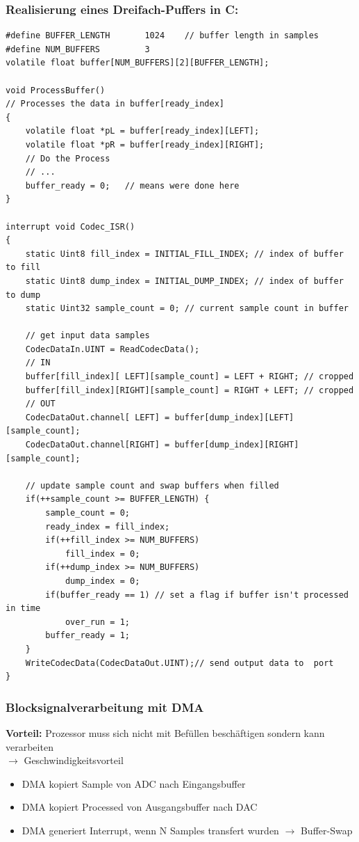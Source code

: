 \documentclass[10pt,a4paper]{article}
\begin{document}
\subsubsection{Realisierung eines Dreifach-Puffers in C:}
\begin{verbatim}
#define BUFFER_LENGTH   	1024	// buffer length in samples 
#define NUM_BUFFERS         3
volatile float buffer[NUM_BUFFERS][2][BUFFER_LENGTH];

void ProcessBuffer()
// Processes the data in buffer[ready_index]
{
    volatile float *pL = buffer[ready_index][LEFT];
    volatile float *pR = buffer[ready_index][RIGHT];
    // Do the Process
    // ...
    buffer_ready = 0;   // means were done here
}

interrupt void Codec_ISR()
{                    
    static Uint8 fill_index = INITIAL_FILL_INDEX; // index of buffer to fill
    static Uint8 dump_index = INITIAL_DUMP_INDEX; // index of buffer to dump
    static Uint32 sample_count = 0; // current sample count in buffer

    // get input data samples
  	CodecDataIn.UINT = ReadCodecData();		
  	// IN
    buffer[fill_index][ LEFT][sample_count] = LEFT + RIGHT; // cropped
    buffer[fill_index][RIGHT][sample_count] = RIGHT + LEFT; // cropped
    // OUT
    CodecDataOut.channel[ LEFT] = buffer[dump_index][LEFT][sample_count];
    CodecDataOut.channel[RIGHT] = buffer[dump_index][RIGHT][sample_count];

    // update sample count and swap buffers when filled 
    if(++sample_count >= BUFFER_LENGTH) {
        sample_count = 0;
        ready_index = fill_index;
        if(++fill_index >= NUM_BUFFERS)
            fill_index = 0;
        if(++dump_index >= NUM_BUFFERS)
            dump_index = 0;
        if(buffer_ready == 1) // set a flag if buffer isn't processed in time 
            over_run = 1;
        buffer_ready = 1;
    }
	WriteCodecData(CodecDataOut.UINT);// send output data to  port
}
\end{verbatim}

\subsubsection{Blocksignalverarbeitung mit DMA}
\textbf{Vorteil: } Prozessor muss sich nicht mit Befüllen beschäftigen sondern kann verarbeiten\\
$\rightarrow$ Geschwindigkeitsvorteil

\begin{itemize}
    \item DMA kopiert Sample von ADC nach Eingangsbuffer
    \item DMA kopiert Processed von Ausgangsbuffer nach DAC
    \item DMA generiert Interrupt, wenn N Samples transfert wurden $\rightarrow$ Buffer-Swap
\end{itemize}
\end{document}
